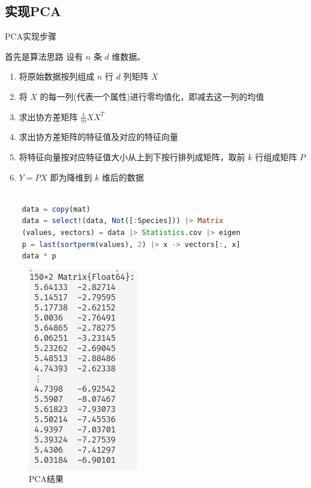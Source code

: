 \documentclass[a4paper]{article}
\begin{document}
\newpage

\subsection{实现PCA} \label{sub:PCA-}

PCA实现步骤

首先是算法思路
设有 $n$ 条 $d$ 维数据。
\begin{enumerate}
    \item 将原始数据按列组成 $n$ 行 $d$ 列矩阵 $X$
    \item 将 $X$ 的每一列(代表一个属性)进行零均值化，即减去这一列的均值
    \item 求出协方差矩阵 $\frac{1}{m}XX^T$
    \item 求出协方差矩阵的特征值及对应的特征向量
    \item 将特征向量按对应特征值大小从上到下按行排列成矩阵，取前 $k$ 行组成矩阵 $P$
    \item $Y=PX$ 即为降维到 $k$ 维后的数据
\end{enumerate}

\begin{lstlisting}[language=julia]

    data = copy(mat)
    data = select!(data, Not([:Species])) |> Matrix 
    (values, vectors) = data |> Statistics.cov |> eigen
    p = last(sortperm(values), 2) |> x -> vectors[:, x]
    data * p

\end{lstlisting}

\begin{figure}[ht]
    \centering
    \includegraphics{matrix.png}
    \caption{PCA结果}
    \label{fig:matrix}
\end{figure}
\end{document}
